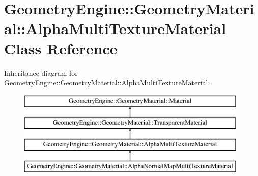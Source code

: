 \hypertarget{class_geometry_engine_1_1_geometry_material_1_1_alpha_multi_texture_material}{}\section{Geometry\+Engine\+::Geometry\+Material\+::Alpha\+Multi\+Texture\+Material Class Reference}
\label{class_geometry_engine_1_1_geometry_material_1_1_alpha_multi_texture_material}
Inheritance diagram for Geometry\+Engine\+::Geometry\+Material\+::Alpha\+Multi\+Texture\+Material\+:\begin{figure}[H]
\begin{center}
\leavevmode
\includegraphics[height=4.000000cm]{class_geometry_engine_1_1_geometry_material_1_1_alpha_multi_texture_material}
\end{center}
\end{figure}
